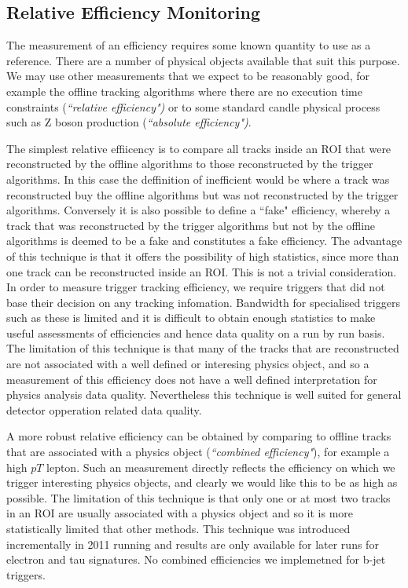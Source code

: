 \subsection{Relative Efficiency Monitoring}

The measurement of an efficiency requires some known quantity to use as a reference.  There are a number of physical objects available that suit this purpose. We may use other measurements that we expect to be reasonably good, for example the offline tracking algorithms where there are no execution time constraints (\emph{``relative efficiency")} or to some standard candle physical process such as Z boson production (\emph{``absolute efficiency")}.

The simplest relative effiicency is to compare all tracks inside an ROI that were reconstructed by the offline algorithms to those reconstructed by the trigger algorithms. In this case the deffinition of inefficient would be where a track was reconstructed buy the offline algorithms but was not reconstructed by the trigger algorithms. Conversely it is also possible to define a ``fake" efficiency, whereby a track that was reconstructed by the trigger algorithms but not by the offline algorithms is deemed to be a fake and constitutes a fake efficiency. 
The advantage of this technique is that it offers the possibility of high statistics, since more than one track can be reconstructed inside an ROI. This is not a trivial consideration. In order to measure trigger tracking efficiency, we require triggers that did not base their decision on any tracking infomation. Bandwidth for specialised triggers such as these is limited and it is difficult to obtain enough statistics to make useful assessments of efficiencies and hence data quality on a run by run basis.
The limitation of this technique is that many of the tracks that are reconstructed are not associated with a well defined or interesing physics object, and so a measurement of this efficiency does not have a well defined interpretation for physics analysis data quality. Nevertheless this technique is well suited for general detector opperation related data quality.

A more robust relative efficiency can be obtained by comparing to offline tracks that are associated with a physics object (\emph{``combined efficiency"}), for example a high $pT$ lepton. Such an measurement directly reflects the efficiency on which we trigger interesting physics objects, and clearly we would like this to be as high as possible. 
The limitation of this technique is that only one or at most two tracks in an ROI are usually associated with a physics object and so it is more statistically limited that other methods. This technique was introduced incrementally in 2011 running and results are only available for later runs for electron and tau signatures. No combined efficiencies we implemetned for b-jet triggers.

